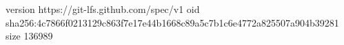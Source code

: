 version https://git-lfs.github.com/spec/v1
oid sha256:4c7866f0213129c863f7e17e44b1668c89a5c7b1c6e4772a825507a904b39281
size 136989
